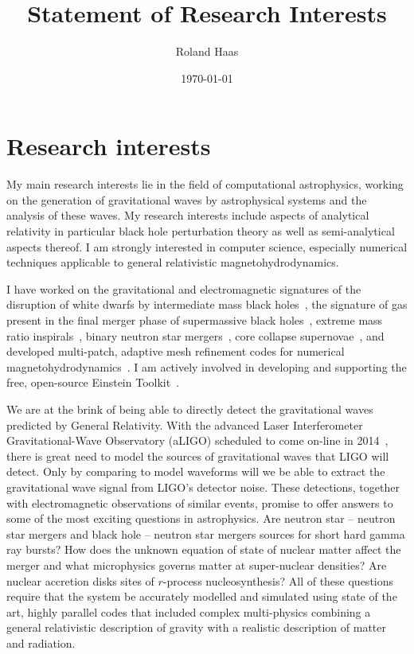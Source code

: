 \documentclass[12pt]{article}
\newcommand{\aligo}{aLIGO}
\newcommand{\ligo}{LIGO}
\begin{document}
\title{Statement of Research Interests}
\author{Roland Haas}
\date{\today}
\maketitle

\section{Research interests}
My main research interests lie in the field of computational astrophysics,
working on the generation of gravitational waves by
astrophysical systems and the analysis of these waves. My research interests
include aspects of analytical
relativity in particular black hole perturbation theory as well as
semi-analytical aspects thereof. I am strongly interested in computer science,
especially numerical techniques applicable to general relativistic
magnetohydrodynamics. 

I have worked on the gravitational and electromagnetic signatures of the
disruption of white dwarfs by intermediate mass black
holes~\cite{2012arXiv1212.4837S, 2012ApJ...749..117H},
the signature of gas present in the final merger phase of
supermassive black holes~\cite{2012ApJ...744...45B,2010ApJ...715.1117B}, extreme mass ratio
inspirals~\cite{2011arXiv1112.3707H,2007PhRvD..75l4011H,2006PhRvD..74d4009H,2005CQGra..22S.739H,2013PhRvD..87d1501Z},
binary neutron star mergers~\cite{Haas:nsns}, core
collapse supernovae~\cite{2012arXiv1210.6674O,2012PhRvD..86b4026O}, 
and developed multi-patch, adaptive mesh
refinement codes for
numerical magnetohydrodynamics~\cite{2012arXiv1212.1191R}. I am actively
involved in developing and supporting the free, open-source Einstein
Toolkit~\cite{2012CQGra..29k5001L}.

We are at the brink of being able to directly detect the gravitational waves
predicted by General Relativity. With the advanced Laser Interferometer
Gravitational-Wave Observatory (\aligo{}) scheduled to come
on-line in 2014~\cite{advLIGO:Web}, there is great need to model the sources of
gravitational waves that \ligo{} will detect. 
Only by comparing to model waveforms will we be able to extract the
gravitational wave signal from \ligo{'s} detector noise.
These detections, together with
electromagnetic observations of similar events, promise to offer answers to
some of the most exciting questions in astrophysics. Are neutron star --
neutron star mergers and black hole -- neutron star mergers sources for short
hard gamma ray bursts?  How does the unknown equation of state of nuclear
matter affect the merger and what microphysics governs matter at
super-nuclear densities? Are nuclear accretion disks sites of $r$-process
nucleosynthesis? All of these questions require that the system be accurately
modelled and simulated using state of the art, highly parallel codes that
included complex multi-physics combining a general relativistic description of
gravity with a realistic description of matter and radiation. 
\end{document}
